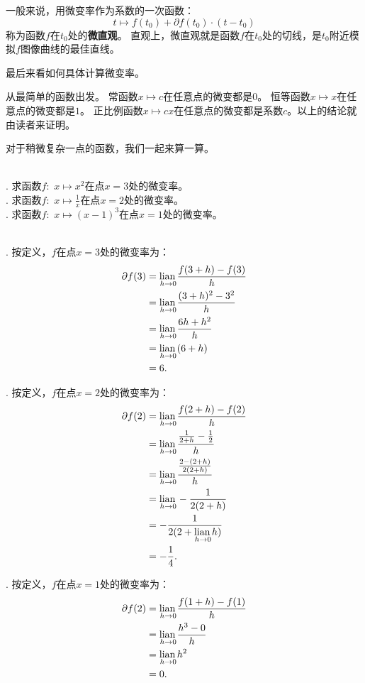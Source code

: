 \documentclass[12pt,UTF8]{ctexbook}
\begin{document}
一般来说，用微变率作为系数的一次函数：
$$ t \mapsto f(t_0) + \partial f(t_0) \cdot(t - t_0)$$
称为函数$f$在$t_0$处的\textbf{微直观}。
直观上，微直观就是函数$f$在$t_0$处的切线，是$t_0$附近模拟$f$图像曲线的最佳直线。

最后来看如何具体计算微变率。

从最简单的函数出发。
常函数$x \mapsto c$在任意点的微变都是$0$。
恒等函数$x\mapsto x$在任意点的微变都是$1$。
正比例函数$x \mapsto c x$在任意点的微变都是系数$c$。以上的结论就由读者来证明。

对于稍微复杂一点的函数，我们一起来算一算。

\begin{et}
    \mbox{} \\
    . 求函数$f: \,\, x \mapsto x^2$在点$x = 3$处的微变率。\\
    . 求函数$f: \,\, x \mapsto \frac{1}{x}$在点$x = 2$处的微变率。\\
    . 求函数$f: \,\, x \mapsto (x - 1)^3$在点$x = 1$处的微变率。
\end{et}

\begin{so}
    \mbox{} \\
    . 按定义，$f$在点$x = 3$处的微变率为：
    \begin{align*}
        \partial f(3) &= \underset{h\to 0}{\operatorname{lian}\,}\frac{f(3 + h) - f(3)}{h}  \\
        &= \underset{h\to 0}{\operatorname{lian}\,}\frac{(3 + h)^2 - 3^2}{h}  \\
        &= \underset{h\to 0}{\operatorname{lian}\,}\frac{6h + h^2}{h}  \\
        &= \underset{h\to 0}{\operatorname{lian}\,}(6 + h)  \\
        &= 6.  
    \end{align*}

    . 按定义，$f$在点$x = 2$处的微变率为：
    \begin{align*}
        \partial f(2) &= \underset{h\to 0}{\operatorname{lian}\,}\frac{f(2 + h) - f(2)}{h}  \\
        &= \underset{h\to 0}{\operatorname{lian}\,}\frac{\frac{1}{2+h} - \frac{1}{2}}{h}  \\
        &= \underset{h\to 0}{\operatorname{lian}\,}\frac{\frac{2 - (2 + h)}{2(2 + h)}}{h}  \\
        &= \underset{h\to 0}{\operatorname{lian}\,}-\frac{1}{2(2 + h)}  \\
        &= -\frac{1}{2(2 + \underset{h\to 0}{\operatorname{lian}\,}h)}  \\
        &= -\frac{1}{4}. 
    \end{align*}

    . 按定义，$f$在点$x = 1$处的微变率为：
    \begin{align*}
        \partial f(2) &= \underset{h\to 0}{\operatorname{lian}\,}\frac{f(1 + h) - f(1)}{h}  \\
        &= \underset{h\to 0}{\operatorname{lian}\,}\frac{h^3 - 0}{h}  \\
        &= \underset{h\to 0}{\operatorname{lian}\,}h^2  \\
        &= 0. 
    \end{align*}
\end{so}
\end{document}
